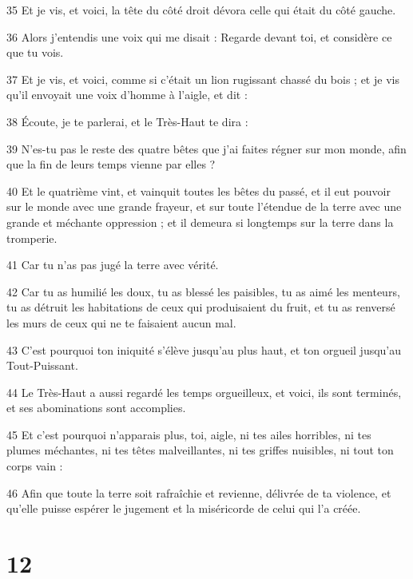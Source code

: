 \par 35 Et je vis, et voici, la tête du côté droit dévora celle qui était du côté gauche.
\par 36 Alors j'entendis une voix qui me disait : Regarde devant toi, et considère ce que tu vois.
\par 37 Et je vis, et voici, comme si c'était un lion rugissant chassé du bois ; et je vis qu'il envoyait une voix d'homme à l'aigle, et dit :
\par 38 Écoute, je te parlerai, et le Très-Haut te dira :
\par 39 N'es-tu pas le reste des quatre bêtes que j'ai faites régner sur mon monde, afin que la fin de leurs temps vienne par elles ?
\par 40 Et le quatrième vint, et vainquit toutes les bêtes du passé, et il eut pouvoir sur le monde avec une grande frayeur, et sur toute l'étendue de la terre avec une grande et méchante oppression ; et il demeura si longtemps sur la terre dans la tromperie.
\par 41 Car tu n'as pas jugé la terre avec vérité.
\par 42 Car tu as humilié les doux, tu as blessé les paisibles, tu as aimé les menteurs, tu as détruit les habitations de ceux qui produisaient du fruit, et tu as renversé les murs de ceux qui ne te faisaient aucun mal.
\par 43 C'est pourquoi ton iniquité s'élève jusqu'au plus haut, et ton orgueil jusqu'au Tout-Puissant.
\par 44 Le Très-Haut a aussi regardé les temps orgueilleux, et voici, ils sont terminés, et ses abominations sont accomplies.
\par 45 Et c'est pourquoi n'apparais plus, toi, aigle, ni tes ailes horribles, ni tes plumes méchantes, ni tes têtes malveillantes, ni tes griffes nuisibles, ni tout ton corps vain :
\par 46 Afin que toute la terre soit rafraîchie et revienne, délivrée de ta violence, et qu'elle puisse espérer le jugement et la miséricorde de celui qui l'a créée.

\chapter{12}

